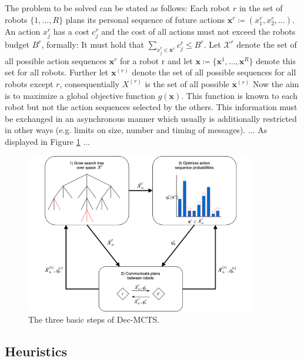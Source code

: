 The problem to be solved can be stated as follows: Each robot $r$ in the set of robots $\{1,\ldots,R\}$ plans its personal sequence of future actions $ \mathbf{x}^r \coloneqq (x_1^r,x_2^r,\ldots)$. An action $x_j^r$ has a cost $c_j^r$ and the cost of all actions must not exceed the robots budget $B^r$, formally: It must hold that $\sum_{x_j^r \in \mathbf{x}^r} c_j^r \leq B^r$. Let $\mathcal{X}^r$ denote the set of all possible action sequences $\mathbf{x}^r$ for a robot r and let $\mathbf{x} \coloneqq \{\mathbf{x}
^1, \ldots , \mathbf{x}^R\}$ denote this set for all robots. Further let $\mathbf{x}^{(r)}$ denote the set of all possible sequences for all robots except $r$, consequentially $X^{(r)}$ is the set of all possible $\mathbf{x}^(r)$  Now the aim is to maximize a global objective function $g(\mathbf{x})$. This function is known to each robot but not the action sequences selected by the others. This information must be exchanged in an asynchronous manner which usually is additionally restricted in other ways (e.g. limits on size, number and timing of messages). ... As displayed in Figure \ref{fig:dec_mcts} ... 

\begin{figure}
    \centering
    \includegraphics[width=0.9\textwidth]{img/dec-mcts.png}
    \caption{The three basic steps of Dec-MCTS.}
    \label{fig:dec_mcts}
\end{figure}
\subsection{Heuristics}
\label{ss:heuristics}

